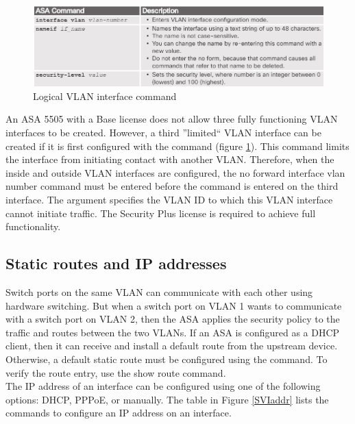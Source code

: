 \begin{figure}[hbtp]
\caption{Logical VLAN interface command}\label{ASAlogicalVLAN}
\centering
\includegraphics[scale=0.5]{pictures/ASAlogicalVLAN.PNG}
\end{figure}


An ASA 5505 with a Base license does not allow three fully functioning VLAN interfaces to be created. However, a third ''limited`` VLAN interface can be created if it is first configured with the  command (figure \ref{ASAlogicalVLAN}). This command limits the interface from initiating contact with another VLAN. Therefore, when the inside and outside VLAN interfaces are configured, the no forward interface vlan number command must be entered before the  command is entered on the third interface. The  argument specifies the VLAN ID to which this VLAN interface cannot initiate traffic. The Security Plus license is required to achieve full functionality.\\

\subsection{Static routes and IP addresses}

Switch ports on the same VLAN can communicate with each other using hardware switching. But when a switch port on VLAN 1 wants to communicate with a switch port on VLAN 2, then the ASA applies the security policy to the traffic and routes between the two VLANs. If an ASA is configured as a DHCP client, then it can receive and install a default route from the upstream device. Otherwise, a default static route must be configured using the  command. To verify the route entry, use the show route command.\\

The IP address of an interface can be configured using one of the following options: DHCP, PPPoE, or manually. The table in Figure \ref{SVIaddr} lists the commands to configure an IP address on an interface. 

